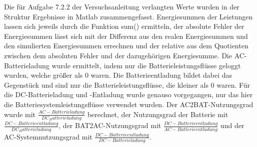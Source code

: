 Die für Aufgabe 7.2.2 der Versuchsanleitung \cite[S. 11]{Laboranleitung} verlangten Werte wurden in der Struktur Ergebnisse in Matlab zusammengefasst.
Energiesummen der Leistungen lassen sich jeweils durch die Funktion sum() ermitteln, der absolute Fehler der Energiesummen lässt sich mit der Differenz aus den realen Energiesummen und den simulierten Energiesummen errechnen und der relative aus dem Quotienten zwischen dem absoluten Fehler und der dazugehörigen Energiesumme.
Die AC-Batterieladung wurde ermittelt, indem nur die Batterieleistungsflüsse geloggt wurden, welche größer als 0 waren.
Die Batterieentladung bildet dabei das Gegenstück und sind nur die Batterieleistungsflüsse, die kleiner als 0 waren.
Für die DC-Batterieladung und -Entladung wurde genauso vorgegangen, nur das hier die Batteriesystemleistungsflüsse verwendet wurden.
Der AC2BAT-Nutzungsgrad wurde mit $\frac{AC-Batterieladung}{DC_Batterieladung}$ berechnet, der Nutzungsgrad der Batterie mit $\frac{DC-Batterieentladung}{DC_Batterieladung}$, der BAT2AC-Nutzungsgrad mit $\frac{DC-Batterieentladung}{AC-Batterieentladung}$ und der AC-Systemnutzungsgrad mit $\frac{DC-Batterieentladung}{DC-Batterieladung}$.
\\
